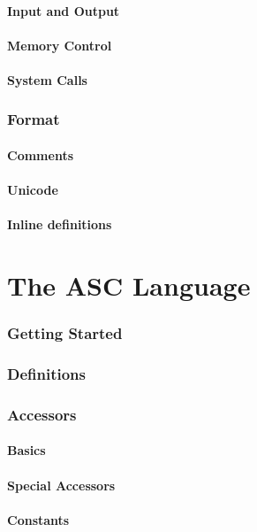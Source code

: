 \documentclass{scrartcl}
\begin{document}
        \subsection{Input and Output}
        \subsection{Memory Control}
        \subsection{System Calls}
    \section{Format}
        \subsection{Comments}
        \subsection{Unicode}
        \subsection{Inline definitions}
\part{The ASC Language}
    \section{Getting Started}
    \section{Definitions}
    \section{Accessors}
        \subsection{Basics}
        \subsection{Special Accessors}
        \subsection{Constants}
\end{document}
